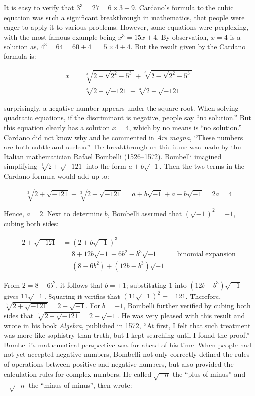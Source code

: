 \documentclass[b5paper]{article}
\begin{document}
It is easy to verify that $3^3 = 27 = 6 \times 3 + 9$. Cardano's formula to the cubic equation was such a significant breakthrough in mathematics, that people were eager to apply it to various problems. However, some equations were perplexing, with the most famous example being $x^3 = 15x + 4$. By observation, $x = 4$ is a solution as, $4^3 = 64 = 60 + 4 = 15 \times 4 + 4$. But the result given by the Cardano formula is:

\begin{align*}
x &= \sqrt[3]{2 + \sqrt{2^2 - 5^3}} + \sqrt[3]{2 - \sqrt{2^2 - 5^3}}  \\
  &= \sqrt[3]{2 + \sqrt{-121}} + \sqrt[3]{2 - \sqrt{-121}}
\end{align*}

surprisingly, a negative number appears under the square root. When solving quadratic equations, if the discriminant is negative, people say \enquote{no solution.} But this equation clearly has a solution $x = 4$, which by no means is \enquote{no solution.} Cardano did not know why and he commented in \emph{Ars magna}, \enquote{These numbers are both subtle and useless.} The breakthrough on this issue was made by the Italian mathematician Rafael Bombelli (1526–1572). Bombelli imagined simplifying $\sqrt[3]{2 \pm \sqrt{-121}}$ into the form $a \pm b\sqrt{-1}$. Then the two terms in the Cardano formula would add up to:

\[
\sqrt[3]{2 + \sqrt{-121}} + \sqrt[3]{2 - \sqrt{-121}} = a + b\sqrt{-1} + a - b\sqrt{-1} = 2a = 4
\]

Hence, $a = 2$. Next to determine $b$, Bombelli assumed that $(\sqrt{-1})^2 = -1$, cubing both sides:

\begin{align*}
2 + \sqrt{-121} &= (2 + b\sqrt{-1})^3 \\
  &= 8 + 12b\sqrt{-1} - 6b^2 - b^3\sqrt{-1} && \text{binomial expansion} \\
  &= (8 - 6b^2) + (12b - b^3)\sqrt{-1}
\end{align*}

From $2 = 8 - 6b^2$, it follows that $b = \pm 1$; substituting $1$ into $(12b - b^3)\sqrt{-1}$ gives $11\sqrt{-1}$. Squaring it verifies that $(11\sqrt{-1})^2 = -121$. Therefore, $\sqrt[3]{2 + \sqrt{-121}} = 2 + \sqrt{-1}$. For $b = -1$, Bombelli further verified by cubing both sides that $\sqrt[3]{2 - \sqrt{-121}} = 2 - \sqrt{-1}$. He was very pleased with this result and wrote in his book \emph{Algebra}, published in 1572, \enquote{At first, I felt that such treatment was more like sophistry than truth, but I kept searching until I found the proof.}\cite{OMerino-2006} Bombelli's mathematical perspective was far ahead of his time. When people had not yet accepted negative numbers, Bombelli not only correctly defined the rules of operations between positive and negative numbers, but also provided the calculation rules for complex numbers. He called $\sqrt{-n}$ the \enquote{plus of minus} and $-\sqrt{-n}$ the \enquote{minus of minus}, then wrote\cite{MacTour-Bombelli}:
\end{document}

